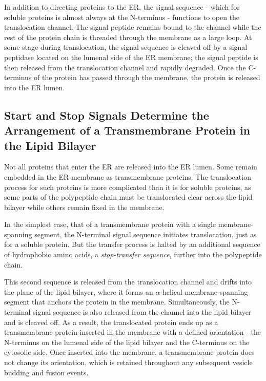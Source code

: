 In addition to directing proteins to the ER, the signal sequence - which for
soluble proteins is almost always at the N-terminus - functions to open
the translocation channel. The signal peptide remains bound to the channel 
while the rest of the protein chain is threaded through the membrane
as a large loop. At some stage during translocation, the signal sequence
is cleaved off by a signal peptidase located on the lumenal side of the
ER membrane; the signal peptide is then released from the translocation
channel and rapidly degraded. Once the C-terminus of the protein has
passed through the membrane, the protein is released into the ER lumen.

\subsection{Start and Stop Signals Determine the Arrangement of a Transmembrane Protein in the Lipid Bilayer}

Not all proteins that enter the ER are released into the ER lumen. Some
remain embedded in the ER membrane as transmembrane proteins.
The translocation process for such proteins is more complicated than it
is for soluble proteins, as some parts of the polypeptide chain must be
translocated clear across the lipid bilayer while others remain fixed in the
membrane.

In the simplest case, that of a transmembrane protein with a single
membrane-spanning segment, the N-terminal signal sequence initiates
translocation, just as for a soluble protein. But the transfer process is
halted by an additional sequence of hydrophobic amino acids, a \textit{stop-transfer 
sequence}, further into the polypeptide chain.

This second sequence is released from the translocation channel and drifts into
the plane of the lipid bilayer, where it forms an $\alpha$-helical membrane-spanning 
segment that anchors the protein in the membrane. Simultaneously,
the N-terminal signal sequence is also released from the channel into the
lipid bilayer and is cleaved off. As a result, the translocated protein ends
up as a transmembrane protein inserted in the membrane with a defined
orientation - the N-terminus on the lumenal side of the lipid bilayer and
the C-terminus on the cytosolic side.
Once inserted into the membrane, a transmembrane protein
does not change its orientation, which is retained throughout any subsequent 
vesicle budding and fusion events.

